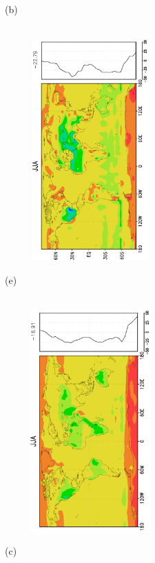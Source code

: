 \documentclass[12pt,a4paper,twoside,openright,headinclude,liststotoc,bibtotoc]{scrreprt}
\begin{document}
\begin{figure}[H]
{}
\parbox{8.5cm}{\hspace{0.50cm}\begin{scriptsize}(b)\end{scriptsize} \vspace{-0.7cm} \\
\includegraphics[height=8.5cm,width=6.5cm,angle=-90]
{eps/zonalysmsshflu146JJA.eps}
}
\parbox{8.5cm}{\hspace{0.30cm}\begin{scriptsize}(e)\end{scriptsize} \vspace{-0.7cm} \\
\includegraphics[height=8.5cm,width=6.5cm,angle=-90]
{eps/zonalt21ysmsshfl146JJAfinal.eps}
}
\parbox{8.4cm}{\hspace{0.50cm}\begin{scriptsize}(c)\end{scriptsize} \vspace{-0.7cm} \\
}
\end{figure}
\end{document}
